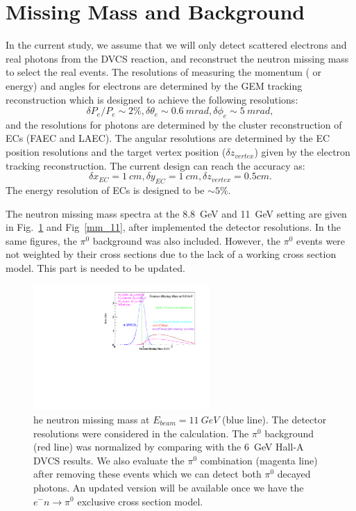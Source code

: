 \documentclass[a4paper,10.5pt]{article}
\begin{document}
\section{Missing Mass and Background}
 
 In the current study, we assume that we will only detect scattered electrons and real photons from the DVCS reaction, and reconstruct the neutron missing mass to select the real events. The resolutions of measuring the momentum ( or energy) and angles for electrons are determined by the GEM tracking reconstruction which is designed to achieve the following resolutions:
 \begin{equation*}
    \delta P_{e}/P_{e} \sim 2\%, \delta \theta_{e} \sim 0.6~mrad, \delta\phi_{e} \sim 5~mrad,
 \end{equation*}
and the resolutions for photons are determined by the cluster reconstruction of ECs (FAEC and LAEC). The angular resolutions are determined by the EC position resolutions and the target vertex position ($\delta z_{vertex}$) given by the electron tracking reconstruction. The current design can reach the accuracy as:
\begin{equation*}
  \delta x_{EC} = 1~cm, \delta y_{EC} = 1~cm, \delta z_{vertex} = 0.5cm.
\end{equation*}
The energy resolution of ECs is designed to be $\sim 5\%$.

The neutron missing mass spectra at the 8.8~GeV and 11~GeV setting are given in Fig.~\ref{mm_8} and Fig~\ref{mm_11}, after implemented the detector resolutions. In the same figures, the $\pi^{0}$ background was also included. However, the $\pi^{0}$ events were not weighted by their cross sections due to the lack of a working cross section model. This part is needed to be updated.

 \begin{figure}[!ht]
 \begin{center}
  \includegraphics[width=0.6\textwidth]{./figures/neutron_DVCS_pi0_MM_8.pdf}
  \caption[The neutron missing mass at $E_{beam}=8.8~GeV$]{\footnotesize{he neutron missing mass at $E_{beam}=11~GeV$ (blue line). The detector resolutions were considered in the calculation. The $\pi^{0}$ background (red line) was normalized by comparing with the 6~GeV Hall-A DVCS results. We also evaluate the $\pi^{0}$ combination (magenta line) after removing these events which we can detect both $\pi^{0}$ decayed photons. An updated version will be available once we have the $e^{-}n\rightarrow\pi^{0}$ exclusive cross section model.}}
  \label{mm_8}
 \end{center}
\end{figure}
\end{document}
